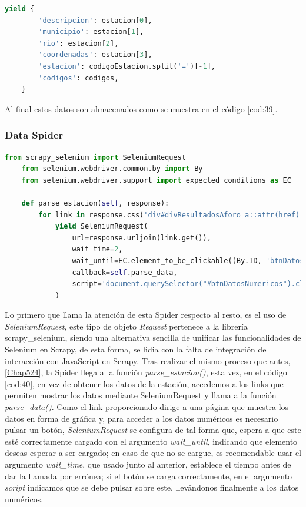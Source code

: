 \begin{lstlisting}[language=Python, caption={Guardado de datos de Agua en Navarra Code Spider}, label=cod:39]
	yield {
		'descripcion': estacion[0],
		'municipio': estacion[1],
		'rio': estacion[2],
		'coordenadas': estacion[3],
		'estacion': codigoEstacion.split('=')[-1],
		'codigos': codigos,
	}
\end{lstlisting}

Al final estos datos son almacenados como se muestra en el código \ref{cod:39}.

\subsubsection{Data Spider}

\begin{lstlisting}[language=Python, caption={Función \textit{parse\_estacion()} Agua en Navarra Data Spider}, label=cod:40]
	from scrapy_selenium import SeleniumRequest
	from selenium.webdriver.common.by import By
	from selenium.webdriver.support import expected_conditions as EC
	
	def parse_estacion(self, response):
		for link in response.css('div#divResultadosAforo a::attr(href)'):
			yield SeleniumRequest(
				url=response.urljoin(link.get()),
				wait_time=2,
				wait_until=EC.element_to_be_clickable((By.ID, 'btnDatosNumericos')),
				callback=self.parse_data,
				script='document.querySelector("#btnDatosNumericos").click()',
			)
\end{lstlisting}

Lo primero que llama la atención de esta Spider respecto al resto, es el uso de \textit{SeleniumRequest}, este tipo de objeto \textit{Request} pertenece a la librería scrapy\_selenium, siendo una alternativa sencilla de unificar las funcionalidades de Selenium en Scrapy, de esta forma, se lidia con la falta de integración de interacción con JavaScript en Scrapy.\newline
\newline
Tras realizar el mismo proceso que antes, \ref{Chap524}, la Spider llega a la función \textit{parse\_estacion()}, esta vez, en el código \ref{cod:40}, en vez de obtener los datos de la estación, accedemos a los links que permiten mostrar los datos mediante SeleniumRequest y llama a la función \textit{parse\_data()}.\newline
\newline
Como el link proporcionado dirige a una página que muestra los datos en forma de gráfica y, para acceder a los datos numéricos es necesario pulsar un botón, \textit{SeleniumRequest} se configura de tal forma que, espera a que este esté correctamente cargado con el argumento \textit{wait\_until}, indicando que elemento deseas esperar a ser cargado; en caso de que no se cargue, es recomendable usar el argumento \textit{wait\_time}, que usado junto al anterior, establece el tiempo antes de dar la llamada por errónea; si el botón se carga correctamente, en el argumento \textit{script} indicamos que se debe pulsar sobre este, llevándonos finalmente a los datos numéricos.

